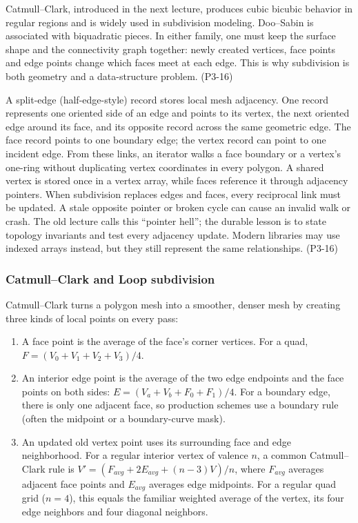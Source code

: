 Catmull--Clark, introduced in the next lecture, produces cubic bicubic behavior in regular regions and is widely used in subdivision modeling. Doo--Sabin is associated with biquadratic pieces. In either family, one must keep the surface shape and the connectivity graph together: newly created vertices, face points and edge points change which faces meet at each edge. This is why subdivision is both geometry and a data-structure problem. (P3-16)

A split-edge (half-edge-style) record stores local mesh adjacency. One record represents one oriented side of an edge and points to its vertex, the next oriented edge around its face, and its opposite record across the same geometric edge. The face record points to one boundary edge; the vertex record can point to one incident edge. From these links, an iterator walks a face boundary or a vertex's one-ring without duplicating vertex coordinates in every polygon. A shared vertex is stored once in a vertex array, while faces reference it through adjacency pointers. When subdivision replaces edges and faces, every reciprocal link must be updated. A stale opposite pointer or broken cycle can cause an invalid walk or crash. The old lecture calls this ``pointer hell''; the durable lesson is to state topology invariants and test every adjacency update. Modern libraries may use indexed arrays instead, but they still represent the same relationships. (P3-16)

\subsubsection{Catmull--Clark and Loop subdivision}\label{03-visual-computing-i-ch002-catmullclark-and-loop-subdivision}

\hypertarget{03-visual-computing-i-ch002-catmullclark-and-loop-subdivision}{}

Catmull--Clark turns a polygon mesh into a smoother, denser mesh by creating three kinds of local points on every pass:

\begin{enumerate}
\def\labelenumi{\arabic{enumi}.}
\tightlist
\item
  A face point is the average of the face's corner vertices. For a quad, \(F=(V_0+V_1+V_2+V_3)/4\).
\item
  An interior edge point is the average of the two edge endpoints and the face points on both sides: \(E=(V_a+V_b+F_0+F_1)/4\). For a boundary edge, there is only one adjacent face, so production schemes use a boundary rule (often the midpoint or a boundary-curve mask).
\item
  An updated old vertex point uses its surrounding face and edge neighborhood. For a regular interior vertex of valence \(n\), a common Catmull--Clark rule is \(V'=(F_{avg}+2E_{avg}+(n-3)V)/n\), where \(F_{avg}\) averages adjacent face points and \(E_{avg}\) averages edge midpoints. For a regular quad grid (\(n=4\)), this equals the familiar weighted average of the vertex, its four edge neighbors and four diagonal neighbors.
\end{enumerate}

